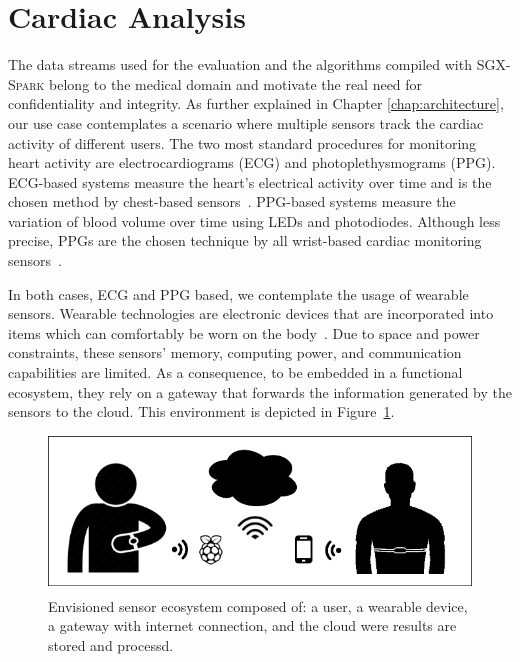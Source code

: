 \section{Cardiac Analysis} \label{sec:background:med}
The data streams used for the evaluation and the algorithms compiled with \textsc{SGX-Spark} belong to the medical domain and motivate the real need for confidentiality and integrity. 
As further explained in Chapter \ref{chap:architecture}, our use case contemplates a scenario where multiple sensors track the cardiac activity of different users.
The two most standard procedures for monitoring heart activity are electrocardiograms (ECG) and photoplethysmograms (PPG).
ECG-based systems measure the heart's electrical activity over time and is the chosen method by chest-based sensors~\cite{Tamura2018}.
PPG-based systems measure the variation of blood volume over time using LEDs and photodiodes.
Although less precise, PPGs are the chosen technique by all wrist-based cardiac monitoring sensors~\cite{Parak2015}.

In both cases, ECG and PPG based, we contemplate the usage of wearable sensors.
Wearable technologies are electronic devices that are incorporated into items which can comfortably be worn on the body~\cite{WearableDevices}.
Due to space and power constraints, these sensors' memory, computing power, and communication capabilities are limited.
As a consequence, to be embedded in a functional ecosystem, they rely on a gateway that forwards the information generated by the sensors to the cloud.
This environment is depicted in Figure~\ref{fig:wearable-ecosystem}.
\begin{figure}[h!]
    \centering
    \includegraphics[width=.8\textwidth]{./img/wearable-ecosystem.png}
    \caption{Envisioned sensor ecosystem composed of: a user, a wearable device, a gateway with internet connection, and the cloud were results are stored and processd.\label{fig:wearable-ecosystem}}
\end{figure}

